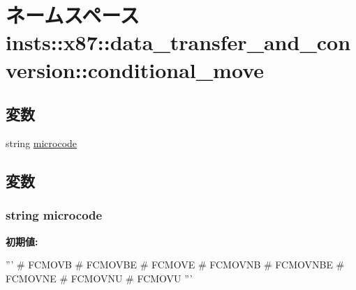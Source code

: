 \hypertarget{namespaceinsts_1_1x87_1_1data__transfer__and__conversion_1_1conditional__move}{
\section{ネームスペース insts::x87::data\_\-transfer\_\-and\_\-conversion::conditional\_\-move}
\label{namespaceinsts_1_1x87_1_1data__transfer__and__conversion_1_1conditional__move}
}
\subsection*{変数}
\begin{DoxyCompactItemize}
\item 
string \hyperlink{namespaceinsts_1_1x87_1_1data__transfer__and__conversion_1_1conditional__move_a770f11a173e99389a8802f0107ed8f52}{microcode}
\end{DoxyCompactItemize}


\subsection{変数}
\hypertarget{namespaceinsts_1_1x87_1_1data__transfer__and__conversion_1_1conditional__move_a770f11a173e99389a8802f0107ed8f52}{
\subsubsection[{microcode}]{\setlength{\rightskip}{0pt plus 5cm}string {\bf microcode}}}
\label{namespaceinsts_1_1x87_1_1data__transfer__and__conversion_1_1conditional__move_a770f11a173e99389a8802f0107ed8f52}
{\bfseries 初期値:}
\begin{DoxyCode}
'''
# FCMOVB
# FCMOVBE
# FCMOVE
# FCMOVNB
# FCMOVNBE
# FCMOVNE
# FCMOVNU
# FCMOVU
'''
\end{DoxyCode}
